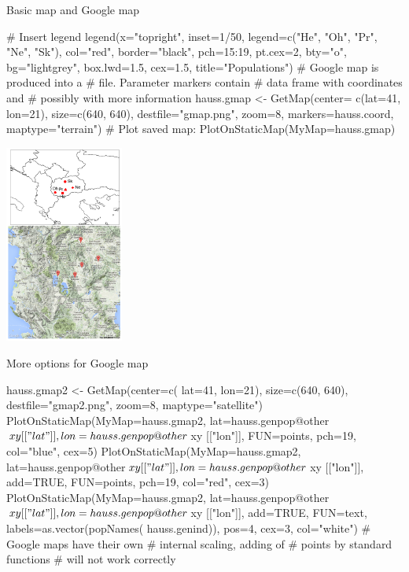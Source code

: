 \documentclass[compress, ucs, xelatex, 11pt, xcolor=svgnames,
  hyperref={
    bookmarks=true,
    unicode=true,
    colorlinks=true,
    pdftitle={Molecular data in R},
    plainpages=false,
    pdfauthor={Vojtech Zeisek},
    pdfsubject={Course about phylogeny and evolution in R},
    pdfcreator={XeLaTeX},
    pdfkeywords={R, evolution, phylogeny, molecular data},
    linkcolor=Tomato,
    anchorcolor=SaddleBrown,
    citecolor=Goldenrod,
    filecolor=DarkMagenta,
    menucolor=Sienna,
    urlcolor=DarkTurquoise,
    pdftex},
  url={hyphens, lowtilde} %
  ]{beamer}
\renewcommand{\texttt}[1]{\hl{\ttfamily #1}}
\begin{document}
\begin{frame}[fragile]{Basic map and Google map}
\begin{multicols}{2}
  \begin{spluscode}
    # Insert legend
    legend(x="topright", inset=1/50,
      legend=c("He", "Oh", "Pr", "Ne",
      "Sk"), col="red", border="black",
      pch=15:19, pt.cex=2, bty="o",
      bg="lightgrey", box.lwd=1.5,
      cex=1.5, title="Populations")
    # Google map is produced into a
    # file. Parameter markers contain
    # data frame with coordinates and
    # possibly with more information
    hauss.gmap <- GetMap(center=
      c(lat=41, lon=21), size=c(640,
      640), destfile="gmap.png",
      zoom=8, markers=hauss.coord,
      maptype="terrain") # Plot saved map:
    PlotOnStaticMap(MyMap=hauss.gmap)
  \end{spluscode}
  \begin{center}
    \includegraphics[height=6.5cm]{maps.png}
  \end{center}
\end{multicols}
\end{frame}

\begin{frame}[fragile]{More options for Google map} %
\begin{multicols}{2}
  \begin{spluscode}
    hauss.gmap2 <- GetMap(center=c(
      lat=41, lon=21), size=c(640,
      640), destfile="gmap2.png",
      zoom=8, maptype="satellite")
    PlotOnStaticMap(MyMap=hauss.gmap2,
      lat=hauss.genpop@other$xy[["lat"
      ]], lon=hauss.genpop@other$xy
      [["lon"]], FUN=points, pch=19,
      col="blue", cex=5)
    PlotOnStaticMap(MyMap=hauss.gmap2,
      lat=hauss.genpop@other$xy[["lat"
      ]], lon=hauss.genpop@other$xy
      [["lon"]], add=TRUE, FUN=points,
      pch=19, col="red", cex=3)
    PlotOnStaticMap(MyMap=hauss.gmap2,
      lat=hauss.genpop@other$xy[["lat"
      ]], lon=hauss.genpop@other$xy
      [["lon"]], add=TRUE, FUN=text,
      labels=as.vector(popNames(
      hauss.genind)), pos=4, cex=3,
      col="white")
    # Google maps have their own
    # internal scaling, adding of
    # points by standard functions
    # will not work correctly
  \end{spluscode}
  \begin{center}
    \texttt{[image: gmap.png]}
  \end{center}
\end{multicols}
\end{frame}
\end{document}
